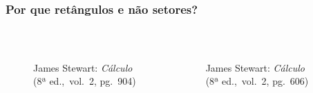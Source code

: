 \documentclass[pdftex, brazil, aspectratio=169]{beamer}
\begin{document}
\begin{frame}
  \frametitle{Por que retângulos e não setores?}
  \begin{columns}
    \centering
  \begin{figure}[H]
    \begin{center}
      \label{fig:int2-30b}
      \\
      \footnotesize{James Stewart: \emph{Cálculo}\\ (8ª ed.,\ vol.\ 2, pg.\ 904)}
    \end{center}
  \end{figure}
    \centering
  \begin{figure}[H]
    \begin{center}
      \label{fig:int2-27b}
      \\
      \footnotesize{James Stewart: \emph{Cálculo}\\ (8ª ed.,\ vol.\ 2, pg.\ 606)}
    \end{center}
  \end{figure}
  \end{columns}
\end{frame}
\end{document}
